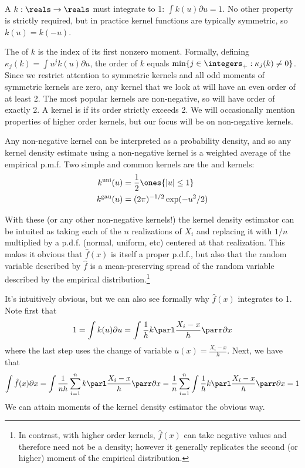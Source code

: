 \documentclass[10pt]{article}
\begin{document}
\begin{definition}
	A  $k : \reals \to \reals$ must integrate to 1: $\int k(u)\partial u=1$. No other property is strictly required, but in practice kernel functions are typically symmetric, so $k(u)=k(-u)$. 
	
	The  of $k$ is the index of its first nonzero moment. Formally, defining $\kappa_j(k) = \int u^j k(u)\partial u$, the order of $k$ equals $\min\{j \in \integers_+ : \kappa_j(k) \ne 0\}$. Since we restrict attention to symmetric kernels and all odd moments of symmetric kernels are zero, any kernel that we look at will have an even order of at least 2. The most popular kernels are non-negative, so will have order of exactly 2. A kernel is  if its order strictly exceeds 2. We will occasionally mention properties of higher order kernels, but our focus will be on non-negative kernels.
\end{definition}
\begin{remark}
	Any non-negative kernel can be interpreted as a probability density, and so any kernel density estimate using a non-negative kernel is a weighted average of the empirical p.m.f. Two simple and common kernels are the  and  kernels:\begin{align*} k^{\text{uni}} (u) &= \frac{1}{2} \ones\{|u| \le 1\} \\ k^{\text{gau}}(u) &= (2\pi)^{-1/2}\exp(-u^2/2)\end{align*}
	
	With these (or any other non-negative kernels!) the kernel density estimator can be intuited as taking each of the $n$ realizations of $X_i$ and replacing it with $1/n$ multiplied by a p.d.f. (normal, uniform, etc) centered at that realization. This makes it obvious that $\hat{f}(x)$ is itself a proper p.d.f., but also that the random variable described by $\hat{f}$ is a mean-preserving spread of the random variable described by the empirical distribution.\footnote{In contrast, with higher order kernels, $\hat{f}(x)$ can take negative values and therefore need not be a density; however it generally replicates the second (or higher) moment of the empirical distribution.}
	
	It's intuitively obvious, but we can also see formally why $\hat{f}(x)$ integrates to 1. Note first that \[1 = \int k(u)\partial u = \int \frac{1}{h} k\parl \frac{X_i-x}{h}\parr\partial x\]where the last step uses the change of variable $u(x) = \frac{X_i-x}{h}$. Next, we have that\[\int \hat{f}(x)\partial x = \int \frac{1}{nh}\sum_{i=1}^n k\parl \frac{X_i-x}{h}\parr \partial x = \frac{1}{n}\sum_{i=1}^n \int  \frac{1}{h} k\parl \frac{X_i-x}{h}\parr\partial x = 1\]We can attain moments of the kernel density estimator the obvious way.
\end{remark}
\end{document}
